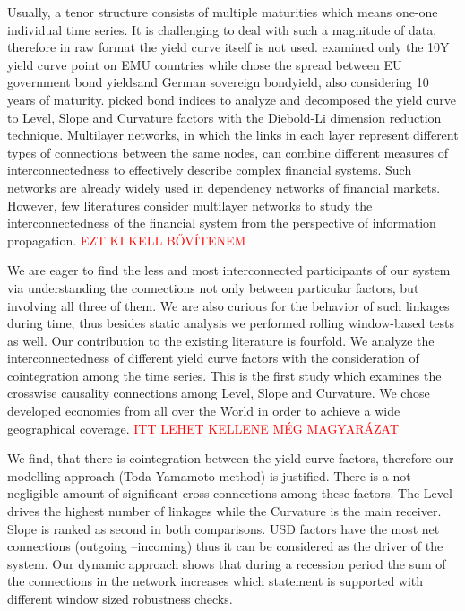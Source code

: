 \documentclass[12pt,bibliography=totoc]{article}
\begin{document}
Usually, a tenor structure consists of multiple maturities which means one-one individual time series. It is challenging to deal with such a magnitude of data, therefore in raw format the yield curve itself is not used. \cite{fernandez2016using} examined only the 10Y yield curve point on EMU countries while \cite{claeys2014measuring} chose the spread between EU government bond yieldsand German sovereign bondyield, also considering 10 years of maturity. \cite{ahmad2018financial} picked bond indices to analyze and \cite{sowmya2016linkages}
decomposed the yield curve to Level, Slope and Curvature factors with the Diebold-Li dimension reduction technique. Multilayer networks, in which the links in each layer represent different types of connections between the same nodes, can combine different measures of interconnectedness to effectively describe complex financial systems. Such networks are already widely used in dependency networks of financial markets. However, few literatures consider multilayer networks to study the interconnectedness of the financial system from the perspective of information propagation. \textcolor{red}{EZT KI KELL BŐVÍTENEM}

We are eager to find the less and most interconnected participants of our system via understanding the connections not only between particular factors, but involving all three of them. We are also curious for the behavior of such linkages during time, thus besides static analysis we performed rolling window-based tests as well. Our contribution to the existing literature is fourfold. We analyze the interconnectedness of different yield curve factors with the consideration of cointegration among the time series. This is the first study which examines the crosswise causality connections among Level, Slope and Curvature. We chose developed economies from all over the World in order to achieve a wide geographical coverage. \textcolor{red}{ITT LEHET KELLENE MÉG MAGYARÁZAT}

We find, that there is cointegration between the yield curve factors, therefore our modelling approach (Toda-Yamamoto method) is justified. There is a not negligible amount of significant cross connections among these factors. The Level drives the highest number of linkages while the Curvature is the main receiver. Slope is ranked as second in both comparisons. USD factors have the most net connections (outgoing –incoming) thus it can be considered as the driver of the system. Our dynamic approach shows that during a recession period the sum of the connections in the network increases which statement is supported with different window sized robustness checks.
\end{document}
